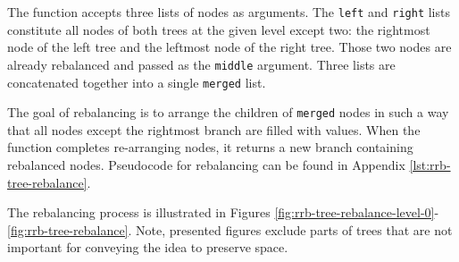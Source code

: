 The  function accepts three lists of nodes as arguments. The \texttt{left} and \texttt{right} lists constitute all nodes of both trees at the given level except two: the rightmost node of the left tree and the leftmost node of the right tree. Those two nodes are already rebalanced and passed as the \texttt{middle} argument. Three lists are concatenated together into a single \texttt{merged} list.

The goal of rebalancing is to arrange the children of \texttt{merged} nodes in such a way that all nodes except the rightmost branch are filled with values. When the  function completes re-arranging nodes, it returns a new branch containing rebalanced nodes. Pseudocode for rebalancing can be found in Appendix \ref{lst:rrb-tree-rebalance}.

The rebalancing process is illustrated in Figures \ref{fig:rrb-tree-rebalance-level-0}-\ref{fig:rrb-tree-rebalance}. Note, presented figures exclude parts of trees that are not important for conveying the idea to preserve space.

